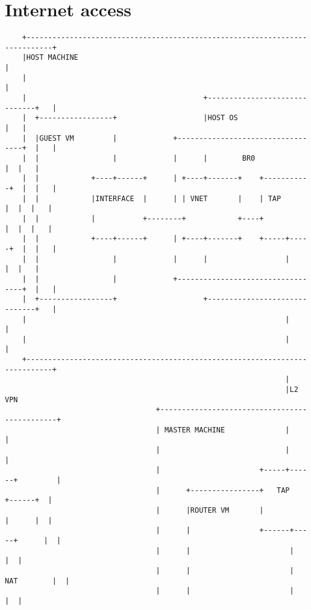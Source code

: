 \section{Internet access}
\small
\begin{verbatim}
    +----------------------------------------------------------------------------+
    |HOST MACHINE                                                                |
    |                                                                            |
    |                                         +------------------------------+   |
    |  +-----------------+                    |HOST OS                       |   |
    |  |GUEST VM         |             +----------------------------------+  |   |
    |  |                 |             |      |        BR0                |  |   |
    |  |            +----+------+      | +----+-------+    +-----------+  |  |   |
    |  |            |INTERFACE  |      | | VNET       |    | TAP       |  |  |   |
    |  |            |           +--------+            +----+           |  |  |   |
    |  |            +----+------+      | +----+-------+    +-----+-----+  |  |   |
    |  |                 |             |      |                  |        |  |   |
    |  |                 |             +----------------------------------+  |   |
    |  +-----------------+                    +------------------------------+   |
    |                                                            |               |
    |                                                            |               |
    +----------------------------------------------------------------------------+
                                                                 |
                                                                 |L2 VPN
                                   +----------------------------------------------+
                                   | MASTER MACHINE              |                |
                                   |                             |                |
                                   |                       +-----+------+         |
                                   |      +----------------+   TAP      +------+  |
                                   |      |ROUTER VM       |            |      |  |
                                   |      |                +------+-----+      |  |
                                   |      |                       |            |  |
                                   |      |                       | NAT        |  |
                                   |      |                       |            |  |

\end{verbatim}
